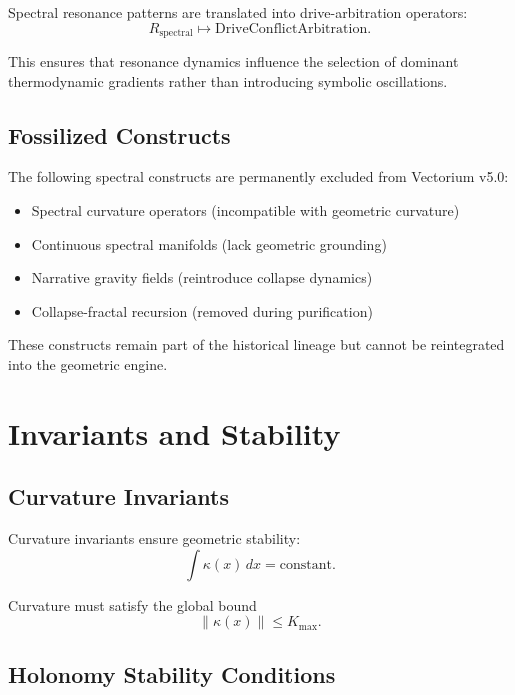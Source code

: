 Spectral resonance patterns are translated into drive-arbitration operators:
\[
R_{\text{spectral}} \mapsto \mathrm{DriveConflictArbitration}.
\]

This ensures that resonance dynamics influence the selection of dominant
thermodynamic gradients rather than introducing symbolic oscillations.

\subsection{Fossilized Constructs}

The following spectral constructs are permanently excluded from Vectorium v5.0:

\begin{itemize}
    \item Spectral curvature operators (incompatible with geometric curvature)
    \item Continuous spectral manifolds (lack geometric grounding)
    \item Narrative gravity fields (reintroduce collapse dynamics)
    \item Collapse-fractal recursion (removed during purification)
\end{itemize}

These constructs remain part of the historical lineage but cannot be reintegrated
into the geometric engine.

\section{Invariants and Stability}

\subsection{Curvature Invariants}

Curvature invariants ensure geometric stability:
\[
\int \kappa(x) \, dx = \text{constant}.
\]

Curvature must satisfy the global bound
\[
\|\kappa(x)\| \le K_{\max}.
\]

\subsection{Holonomy Stability Conditions}

